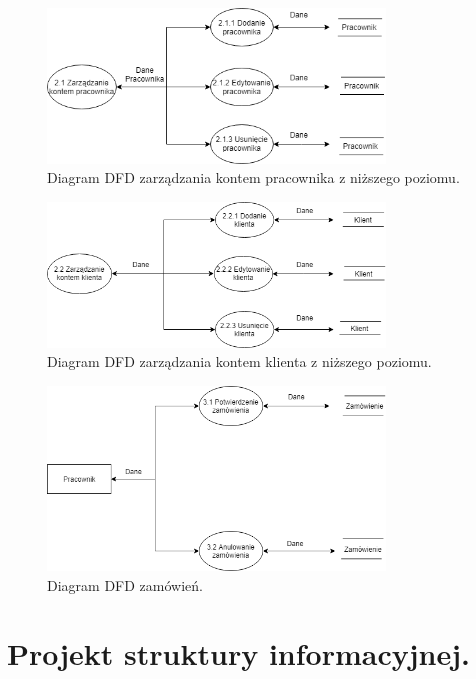 \documentclass[a4paper,11pt]{article}
\begin{document}
\begin{figure}[H]
	\centering
		\includegraphics[width=0.8\textwidth]{Diagramy/DFD0-admin-pracownik.png}
	\caption{Diagram DFD zarządzania kontem pracownika z niższego poziomu.}
\end{figure}

\begin{figure}[H]
	\centering
		\includegraphics[width=0.8\textwidth]{Diagramy/DFD0-admin-klient.png}
	\caption{Diagram DFD zarządzania kontem klienta z niższego poziomu.}
\end{figure}

\begin{figure}[H]
	\centering
		\includegraphics[width=0.8\textwidth]{Diagramy/DFD0-DFD-Zamowienie.png}
	\caption{Diagram DFD zamówień.}
\end{figure}

\section {Projekt struktury informacyjnej.}
\end{document}
